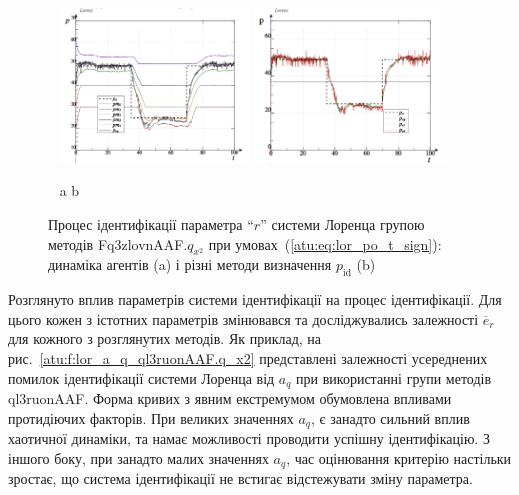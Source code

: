 \documentclass[a4paper,13pt]{atuaref}
\begin{document}
\begin{figure}[ht!]
  \centerline{
    ~ \hfill
    \includegraphics[width=0.45\textwidth]{p5/p/cha/lor/Fq3zlovnAAF/lor_Fq3zlovnAAF_qx2-pl_n_sign_xl.png}
    \hfill
    \includegraphics[width=0.45\textwidth]{p5/p/cha/lor/Fq3zlovnAAF/lor_Fq3zlovnAAF_qx2-p_p_sign_xl.png}
    \hfill ~
  }
  \vspace{-1.5ex}
  \begin{center}
    ~ \hfill a \hfill\hfill b  \hfill ~
  \end{center}
  \vspace{-2.5ex}
  \caption{Процес ідентифікації параметра ``$r$'' системи Лоренца групою методів Fq3zlovnAAF.$q_{x^2}$ при умовах~(\ref{atu:eq:lor_po_t_sign}):
  динаміка агентів (a) і різні методи визначення $p_\mathrm{id}$ (b)}
  \label{atu:f:lor_id_Fq3zlovnAAF.q_x2_sign}
\end{figure}


Розглянуто вплив параметрів системи ідентифікації на процес ідентифікації. Для
цього кожен з істотних параметрів змінювався та досліджувались
залежності $\overline {e}_{r}$ для кожного з розглянутих методів.
Як приклад,
на рис.~\ref{atu:f:lor_a_q_ql3ruonAAF.q_x2} представлені залежності
усереднених помилок ідентифікації системи Лоренца від $a_q$ при використанні
групи методів ql3ruonAAF.
Форма кривих з явним екстремумом обумовлена впливами протидіючих
факторів. При великих значеннях $a_q$, є занадто сильний вплив хаотичної
динаміки, та намає можливості проводити успішну ідентифікацію. З іншого боку, при
занадто малих значеннях $a_q$, час оцінювання критерію настільки зростає, що
система ідентифікації не встигає відстежувати зміну параметра.
\end{document}
